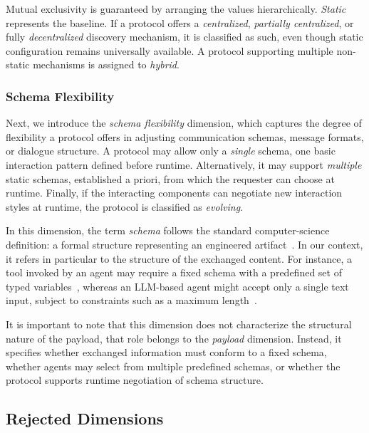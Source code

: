 \documentclass[pdflatex,sn-mathphys-num]{sn-jnl}%
\theoremstyle{thmstyleone}%
\theoremstyle{thmstyletwo}%
\theoremstyle{thmstylethree}%
\begin{document}
Mutual exclusivity is guaranteed by arranging the values hierarchically. \textit{Static} represents the baseline. If a protocol offers a \textit{centralized}, \textit{partially centralized}, or fully \textit{decentralized} discovery mechanism, it is classified as such, even though static configuration remains universally available. A protocol supporting multiple non-static mechanisms is assigned to \textit{hybrid}.

\subsubsection{Schema Flexibility}

Next, we introduce the \textit{schema flexibility} dimension, which captures the degree of flexibility a protocol offers in adjusting communication schemas, message formats, or dialogue structure. A protocol may allow only a \textit{single} schema, one basic interaction pattern defined before runtime. Alternatively, it may support \textit{multiple} static schemas, established a priori, from which the requester can choose at runtime. Finally, if the interacting components can negotiate new interaction styles at runtime, the protocol is classified as \textit{evolving}.

In this dimension, the term \textit{schema} follows the standard computer-science definition: a formal structure representing an engineered artifact~\cite{bernstein2011generic}. In our context, it refers in particular to the structure of the exchanged content. For instance, a tool invoked by an agent may require a fixed schema with a predefined set of typed variables~\cite{mcpdocscorearchitecture}, whereas an LLM-based agent might accept only a single text input, subject to constraints such as a maximum length~\cite{lapdocsapi}.

It is important to note that this dimension does not characterize the structural nature of the payload, that role belongs to the \textit{payload} dimension. Instead, it specifies whether exchanged information must conform to a fixed schema, whether agents may select from multiple predefined schemas, or whether the protocol supports runtime negotiation of schema structure.


\subsection{Rejected Dimensions}
\label{sec:taxonomy-design-rejected-dimensions}
\end{document}
